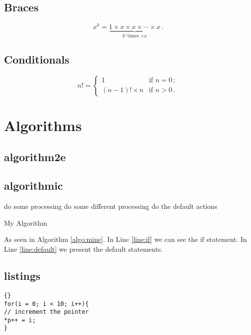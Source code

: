 \documentclass[a4paper, twocolumn]{article}
\begin{document}
\subsection{Braces}
\[ x^{k} =
\underbrace
{1 \times x
	\times x \times
	\dotsb \times x}
_{\text{$k$˜times
		$\times x$}} \,. \]

\subsection{Conditionals}
\[ n! = 
\begin{cases} 1  & \text{if $n = 0$}\,; \\
(n-1) ! \times n & \text{if $n > 0$}\,.
\end{cases} \]

\section{Algorithms}

\subsection{algorithm2e}
\lipsum[1]

\begin{algorithm2e}[tbp]
\end{algorithm2e}

\lipsum[1-2]

\subsection{algorithmic}
\begin{algorithm}
	\begin{algorithmic}[1]
		\label{line:if}
		\STATE do some processing
		\STATE do some different processing
		\ELSE 
		\STATE do the default actions \label{line:default}
		\ENDIF
	\end{algorithmic}
	\caption{My Algorithm}
	\label{algo:mine}
\end{algorithm}

As seen in Algorithm \ref{algo:mine}. In Line \ref{line:if} we can see the if statement. In Line \ref{line:default} we present the default statements. 


\subsection{listings}
\lstset{language=c++}
\lstset{caption=Some C++ Code}
\begin{lstlisting}[frame=single]{}
for(i = 0; i < 10; i++){
// increment the pointer
*p++ = i;
}
\end{lstlisting}
\end{document}
